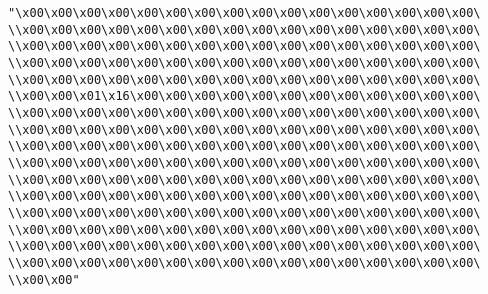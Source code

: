\verb|"\x00\x00\x00\x00\x00\x00\x00\x00\x00\x00\x00\x00\x00\x00\x00\x00\|\newline
\verb|\\x00\x00\x00\x00\x00\x00\x00\x00\x00\x00\x00\x00\x00\x00\x00\x00\|\newline
\verb|\\x00\x00\x00\x00\x00\x00\x00\x00\x00\x00\x00\x00\x00\x00\x00\x00\|\newline
\verb|\\x00\x00\x00\x00\x00\x00\x00\x00\x00\x00\x00\x00\x00\x00\x00\x00\|\newline
\verb|\\x00\x00\x00\x00\x00\x00\x00\x00\x00\x00\x00\x00\x00\x00\x00\x00\|\newline
\verb|\\x00\x00\x01\x16\x00\x00\x00\x00\x00\x00\x00\x00\x00\x00\x00\x00\|\newline
\verb|\\x00\x00\x00\x00\x00\x00\x00\x00\x00\x00\x00\x00\x00\x00\x00\x00\|\newline
\verb|\\x00\x00\x00\x00\x00\x00\x00\x00\x00\x00\x00\x00\x00\x00\x00\x00\|\newline
\verb|\\x00\x00\x00\x00\x00\x00\x00\x00\x00\x00\x00\x00\x00\x00\x00\x00\|\newline
\verb|\\x00\x00\x00\x00\x00\x00\x00\x00\x00\x00\x00\x00\x00\x00\x00\x00\|\newline
\verb|\\x00\x00\x00\x00\x00\x00\x00\x00\x00\x00\x00\x00\x00\x00\x00\x00\|\newline
\verb|\\x00\x00\x00\x00\x00\x00\x00\x00\x00\x00\x00\x00\x00\x00\x00\x00\|\newline
\verb|\\x00\x00\x00\x00\x00\x00\x00\x00\x00\x00\x00\x00\x00\x00\x00\x00\|\newline
\verb|\\x00\x00\x00\x00\x00\x00\x00\x00\x00\x00\x00\x00\x00\x00\x00\x00\|\newline
\verb|\\x00\x00\x00\x00\x00\x00\x00\x00\x00\x00\x00\x00\x00\x00\x00\x00\|\newline
\verb|\\x00\x00\x00\x00\x00\x00\x00\x00\x00\x00\x00\x00\x00\x00\x00\x00\|\newline
\verb|\\x00\x00"|\newline
